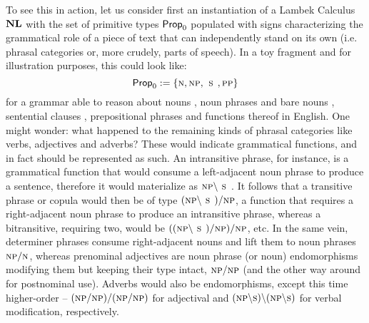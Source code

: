 To see this in action, let us consider first an instantiation of a Lambek Calculus $\textbf{NL}$ with the set of primitive types $\mathsf{Prop}_0$ populated with signs characterizing the grammatical role of a piece of text that can independently stand on its own (i.e. phrasal categories or, more crudely, parts of speech).
In a toy fragment and for illustration purposes, this could look like:
\[
	\propcon := \{\smalln, \smallnp, \smallsmain, \smallpp\}
\]
for a grammar able to reason about nouns \smalln, noun phrases and bare nouns \smallnp{}, sentential clauses \smallsmain{}, prepositional phrases \smallpp{} and functions thereof in English.
One might wonder: what happened to the remaining kinds of phrasal categories like verbs, adjectives and adverbs?
These would indicate grammatical functions, and in fact should be represented as such.
An intransitive phrase, for instance, is a grammatical function that would consume a left-adjacent noun phrase to produce a sentence, therefore it would materialize as $\smallnp\divleft\smallsmain$.
It follows that a transitive phrase or copula would then be of type $(\smallnp\divleft\smallsmain)\divright\smallnp$, a function that requires a right-adjacent noun phrase to produce an intransitive phrase, whereas a bitransitive, requiring two, would be $((\smallnp\divleft\smallsmain)\divright\smallnp)\divright\smallnp$, etc.
In the same vein, determiner phrases consume right-adjacent nouns and lift them to noun phrases $\smallnp\divright\smalln$, whereas prenominal adjectives are noun phrase (or noun) endomorphisms modifying them but keeping their type intact, $\smallnp\divright\smallnp$ (and the other way around for postnominal use).
Adverbs would also be endomorphisms, except this time higher-order -- \linebreak$(\smallnp\divright\smallnp)\divright(\smallnp\divright\smallnp)$ for adjectival and $(\smallnp\divleft\smalls)\divleft(\smallnp\divleft\smalls)$ for verbal modification, respectively.

